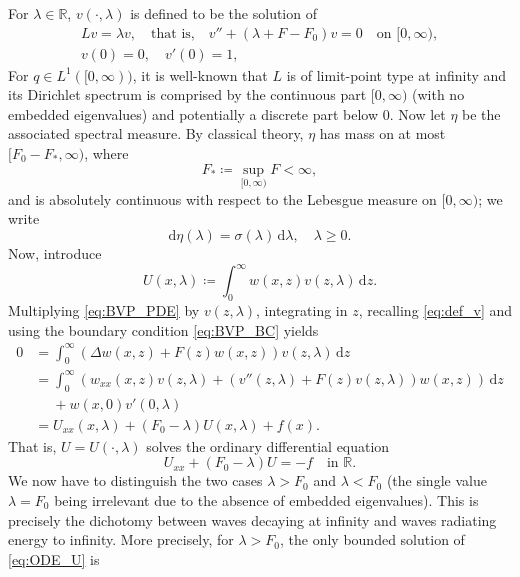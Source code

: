 \documentclass[11pt,twoside,reqno,centertags]{amsart}
\theoremstyle{definition}
\newcommand{\R}{\mathbb R}
\newcommand{\dd}{\mathrm d}
\begin{document}
For $\lambda\in\R$, $v(\cdot,\lambda)$ is defined to be the solution of
\begin{subequations}\label{eq:def_v}
	\begin{gather}
		Lv = \lambda v,\quad \text{that is,}\quad v''+(\lambda+F-F_0)v=0\quad\text{on }[0,\infty),\label{eq:def_v_ODE}\\
		v(0)=0,\quad v'(0)=1,\label{eq:def_v_IC}
	\end{gather}
\end{subequations}
For $q\in L^1([0,\infty))$, it is well-known that $L$ is of limit-point type at infinity and its Dirichlet spectrum is comprised by the continuous part $[0,\infty)$ (with no embedded eigenvalues) and potentially a discrete part below $0$. Now let $\eta$ be the associated spectral measure. By classical theory, $\eta$ has mass on at most $[F_0-F_*,\infty)$, where
\[F_*\coloneqq \sup_{[0,\infty)} F<\infty,\]
and is absolutely continuous with respect to the Lebesgue measure on $[0,\infty)$; we write
\begin{equation}\label{eq:measure_continuous}
	\dd\eta(\lambda) = \sigma(\lambda)\, \dd\lambda, \quad \lambda\ge 0.
\end{equation}
Now, introduce
\begin{equation}\label{eq:def_U}
	U(x,\lambda)\coloneqq\int_0^\infty w(x,z)v(z,\lambda)\,\dd z.
\end{equation}
Multiplying \eqref{eq:BVP_PDE} by $v(z,\lambda)$, integrating in $z$, recalling \eqref{eq:def_v} and using the boundary condition \eqref{eq:BVP_BC} yields
\begin{align*}
	0&=\int_0^\infty(\Delta w(x,z)+F(z)w(x,z))v(z,\lambda)\,\dd z\\
	&=\int_0^\infty(w_{xx}(x,z)v(z,\lambda)+(v''(z,\lambda)+F(z)v(z,\lambda))w(x,z))\,\dd z\\
	&\quad\;+w(x,0)v'(0,\lambda)\\
	&=U_{xx}(x,\lambda)+(F_0-\lambda)U(x,\lambda)+f(x).
\end{align*}
That is, $U=U(\cdot,\lambda)$ solves the ordinary differential equation
\begin{equation}\label{eq:ODE_U}
	U_{xx}+(F_0-\lambda)U=-f\quad\text{in }\R.
\end{equation}
We now have to distinguish the two cases $\lambda>F_0$ and $\lambda<F_0$ (the single value $\lambda=F_0$ being irrelevant due to the absence of embedded eigenvalues). This is precisely the dichotomy between waves decaying at infinity and waves radiating energy to infinity. More precisely, for $\lambda>F_0$, the only bounded solution of \eqref{eq:ODE_U} is
\end{document}
